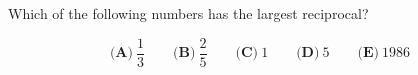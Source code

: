 

Which of the following numbers has the largest reciprocal?

\[ \textbf{(A)}\ \frac{1}{3} \qquad
\textbf{(B)}\ \frac{2}{5} \qquad
\textbf{(C)}\ 1 \qquad
\textbf{(D)}\ 5 \qquad
\textbf{(E)}\ 1986
\]